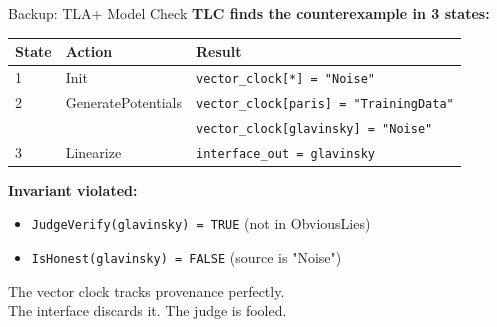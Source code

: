 \documentclass[aspectratio=169,11pt]{beamer}
\begin{document}
\begin{frame}{Backup: TLA+ Model Check}
    \small
    \textbf{TLC finds the counterexample in 3 states:}

    \vspace{0.5em}
    \begin{tabular}{lll}
        \toprule
        \textbf{State} & \textbf{Action} & \textbf{Result} \\
        \midrule
        1 & Init & \texttt{vector\_clock[*] = "Noise"} \\
        2 & GeneratePotentials & \texttt{vector\_clock[paris] = "TrainingData"} \\
          &                    & \texttt{vector\_clock[glavinsky] = "Noise"} \\
        3 & Linearize & \texttt{interface\_out = glavinsky} \\
        \bottomrule
    \end{tabular}

    \vspace{1em}
    \textbf{Invariant violated:}
    \begin{itemize}
        \item \texttt{JudgeVerify(glavinsky) = TRUE} \quad (not in ObviousLies)
        \item \texttt{IsHonest(glavinsky) = FALSE} \quad (source is "Noise")
    \end{itemize}

    \vspace{0.5em}
    The vector clock tracks provenance perfectly.\\
    The interface discards it. The judge is fooled.

\end{frame}
\end{document}
